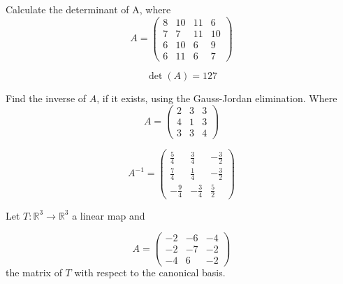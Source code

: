 \begin{questions}

\question Calculate the determinant of A, where
$$
A=\left(\begin{array}{rrrr}
8 & 10 & 11 & 6 \\
7 & 7 & 11 & 10 \\
6 & 10 & 6 & 9 \\
6 & 11 & 6 & 7
\end{array}\right)
$$

\begin{solution}
$$\det(A)=127$$
\end{solution}

\question Find the inverse of $A$, if it exists, using the Gauss-Jordan elimination. Where
$$
A=\left(\begin{array}{rrr}
2 & 3 & 3 \\
4 & 1 & 3 \\
3 & 3 & 4
\end{array}\right)
$$

\begin{solution}
$$A^{-1}=\left(\begin{array}{rrr}
\frac{5}{4} & \frac{3}{4} & -\frac{3}{2} \\
\frac{7}{4} & \frac{1}{4} & -\frac{3}{2} \\
-\frac{9}{4} & -\frac{3}{4} & \frac{5}{2}
\end{array}\right)$$
\end{solution}

\question Let $T:\mathbb{R}^3\rightarrow\mathbb{R}^3$  a linear map and
 
$$
A=\left(\begin{array}{rrr}
-2 & -6 & -4 \\
-2 & -7 & -2 \\
-4 & 6 & -2
\end{array}\right)
$$
the matrix of $T$ with respect to the canonical basis.
\end{questions}
